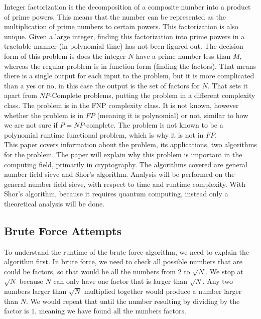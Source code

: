 Integer factorization is the decomposition of a composite number into a product of prime powers. This means that the number can be represented as the multiplication of prime numbers to certain powers. This factorization is also unique. Given a large integer, finding this factorization into prime powers in a tractable manner (in polynomial time) has not been figured out. The decision form of this problem is does the integer $N$ have a prime number less than $M$, whereas the regular problem is in function form (finding the factors). That means there is a single output for each input to the problem, but it is more complicated than a yes or no, in this case the output is the set of factors for $N$. That sets it apart from $NP$-Complete problems, putting the problem in a different complexity class. The problem is in the FNP complexity class. It is not known, however whether the problem is in $FP$ (meaning it is polynomial) or not, similar to how we are not sure if $P=NP$-complete. The problem is not known to be a polynomial runtime functional problem, which is why it is not in $FP$. \\

This paper covers information about the problem, its applications, two algorithms for the problem. The paper will explain why this problem is important in the computing field, primarily in cryptography. The algorithms covered are general number field sieve and Shor’s algorithm. Analysis will be performed on the general number field sieve, with respect to time and runtime complexity. With Shor’s algorithm, because it requires quantum computing, instead only a theoretical analysis will be done. 


\subsection{Brute Force Attempts}

	To understand the runtime of the brute force algorithm, we need to explain the algorithm first. In brute force, we need to check all possible numbers that are could be factors, so that would be all the numbers from $2$ to $\sqrt{N}$. We stop at $\sqrt{N}$ because $N$ can only have one factor that is larger than $\sqrt{N}$. Any two numbers larger than $\sqrt{N}$ multiplied together would produce a number larger than $N$. We would repeat that until the number resulting by dividing by the factor is $1$, meaning we have found all the numbers factors. \\

